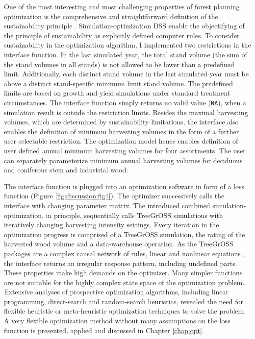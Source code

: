 One of the most interesting and most challenging properties of forest planning optimization is the comprehensive and straightforward definition of the sustainability principle \citep[p. 15]{kangas_2015}. Simulation-optimization DSS enable the objectifying of the principle of sustainability as explicitly defined computer rules. To consider sustainability in the optimization algorithm, I implemented two restrictions in the interface function. In the last simulated year, the total stand volume (the sum of the stand volumes in all stands) is not allowed to be lower than a predefined limit. Additionally, each distinct stand volume in the last simulated year must be above a distinct stand-specific minimum limit stand volume. The predefined limits are based on growth and yield simulations under standard treatment circumstances. The interface function simply returns no valid value ({\tt NA}), when a simulation result is outside the restriction limits. Besides the maximal harvesting volumes, which are determined by sustainability limitations, the interface also enables the definition of minimum harvesting volumes in the form of a further user selectable restriction. The optimization model hence enables definition of user defined annual minimum harvesting volumes for four assortments. The user can separately parameterize minimum annual harvesting volumes for deciduous and coniferous stem and industrial wood.

The interface function is plugged into an optimization software in form of a loss function (Figure \ref{fig:discussion:fig1}). The optimizer successively calls the interface with changing parameter matrix. The introduced combined si\-mu\-la\-tion-op\-ti\-mi\-za\-tion, in principle, sequentially calls TreeGrOSS simulations with iteratively changing harvesting intensity settings. Every iteration in the optimization progress is comprised of a TreeGrOSS simulation, the rating of the harvested wood volume and a data-warehouse operation. As the TreeGrOSS packages are a complex causal network of rules, linear and nonlinear equations \citep[p. 180]{hansen_2014}, the interface returns an irregular response pattern, including undefined parts. These properties make high demands on the optimizer. Many simpler functions are not suitable for the highly complex state space of the optimization problem. Extensive analyses of prospective optimization algorithms, including linear programming, direct-search and random-search heuristics, revealed the need for flexible heuristic or meta-heuristic optimization techniques to solve the problem. A very flexible optimization method without many assumptions on the loss function is presented, applied and discussed in Chapter \ref{chap:opt}.

